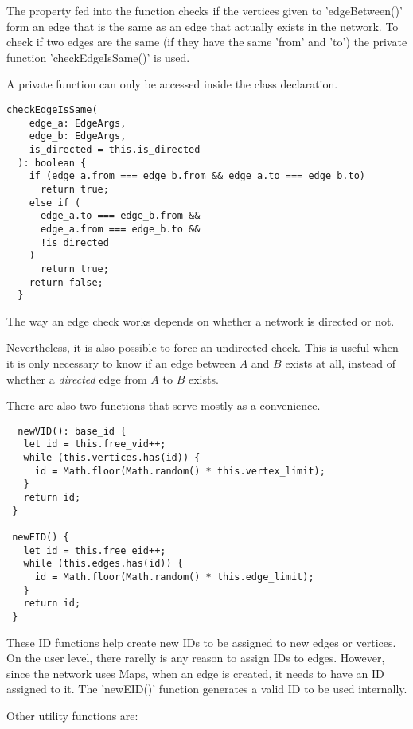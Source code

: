 The property fed into the function checks if the vertices given to 'edgeBetween()' form an edge
that is the same as an edge that actually exists in the network. To check if two edges are the same
(if they have the same 'from' and 'to') the private function 'checkEdgeIsSame()' is used.

A private function can only be accessed inside the class declaration.

\begin{verbatim}
checkEdgeIsSame(
    edge_a: EdgeArgs,
    edge_b: EdgeArgs,
    is_directed = this.is_directed
  ): boolean {
    if (edge_a.from === edge_b.from && edge_a.to === edge_b.to)
      return true;
    else if (
      edge_a.to === edge_b.from &&
      edge_a.from === edge_b.to &&
      !is_directed
    )
      return true;
    return false;
  }
\end{verbatim}

The way an edge check works depends on whether a network is directed or not.

Nevertheless, it is also possible to force an undirected check.
This is useful when it is only necessary to know if an edge between $A$ and $B$ exists at all, 
instead of whether a \textit{directed} edge from $A$ to $B$ exists.

There are also two functions that serve mostly as a convenience.

\begin{verbatim}
  newVID(): base_id {
   let id = this.free_vid++;
   while (this.vertices.has(id)) {
     id = Math.floor(Math.random() * this.vertex_limit);
   }
   return id;
 }
 
 newEID() {
   let id = this.free_eid++;
   while (this.edges.has(id)) {
     id = Math.floor(Math.random() * this.edge_limit);
   }
   return id;
 }
\end{verbatim}

These ID functions help create new IDs to be assigned to new edges or vertices.
On the user level, there rarelly is any reason to assign IDs to edges.
However, since the network uses Maps, when an edge is created, it needs to have
an ID assigned to it.
The 'newEID()' function generates a valid ID to be used internally.

Other utility functions are:

